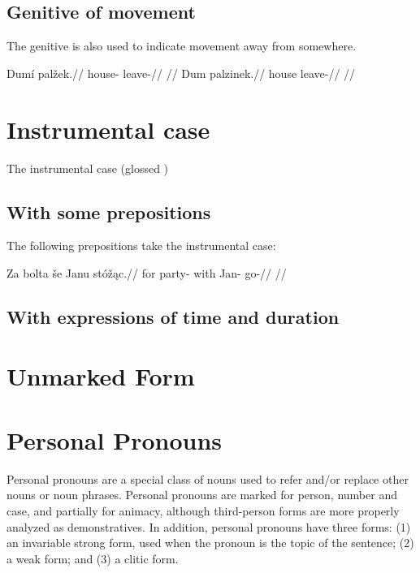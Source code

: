 \subsection{Genitive of movement}

The genitive is also used to indicate movement away from somewhere.

\pex
\a
\begingl
\gla Dum\'i pal\v{z}ek.//
\glb house- leave-//
\glft {}//
\endgl
\a
\begingl
\gla Dum palzinek.//
\glb house leave-//
\glft {}//
\endgl
\xe

\section{Instrumental case}

The instrumental case (glossed )

\subsection{With some prepositions}

The following prepositions take the instrumental case:  

\pex
\begingl
\gla Za bolta \v{s}e Janu st\'o\v{z}\k{a}c.//
\glb for party- with Jan- go-//
\glft {}//
\endgl
\xe

\subsection{With expressions of time and duration}

\section{Unmarked Form}


\section{Personal Pronouns}

Personal pronouns are a special class of nouns used to refer and/or replace other nouns or noun phrases. Personal pronouns are marked for person, number and case, and partially for animacy, although third-person forms are more properly analyzed as demonstratives. In addition, personal pronouns have three forms: (1) an invariable strong form, used when the pronoun is the topic of the sentence; (2) a weak form; and (3) a clitic form.


